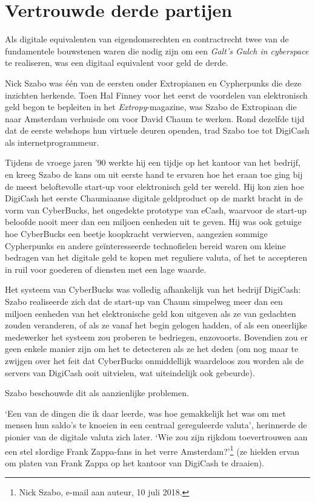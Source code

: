\documentclass[
  a5paper,
  smalldemyvopaper,11pt,twoside,onecolumn,openright,extrafontsizes,
hidelinks]{memoir}
\begin{document}
\section{Vertrouwde derde partijen}\label{vertrouwde-derde-partijen}

Als digitale equivalenten van eigendomsrechten en contractrecht twee van
de fundamentele bouwstenen waren die nodig zijn om een \emph{Galt's
Gulch in cyberspace} te realiseren, was een digitaal equivalent voor
geld de derde.

Nick Szabo was één van de eersten onder Extropianen en Cypherpunks die
deze inzichten herkende. Toen Hal Finney voor het eerst de voordelen van
elektronisch geld begon te bepleiten in het \emph{Extropy}-magazine, was
Szabo de Extropiaan die naar Amsterdam verhuisde om voor David Chaum te
werken. Rond dezelfde tijd dat de eerste webshops hun virtuele deuren
openden, trad Szabo toe tot DigiCash als internetprogrammeur.

Tijdens de vroege jaren '90 werkte hij een tijdje op het kantoor van het
bedrijf, en kreeg Szabo de kans om uit eerste hand te ervaren hoe het
eraan toe ging bij de meest beloftevolle start-up voor elektronisch geld
ter wereld. Hij kon zien hoe DigiCash het eerste Chaumiaanse digitale
geldproduct op de markt bracht in de vorm van CyberBucks, het ongedekte
prototype van eCash, waarvoor de start-up beloofde nooit meer dan een
miljoen eenheden uit te geven. Hij was ook getuige hoe CyberBucks een
beetje koopkracht verwierven, aangezien sommige Cypherpunks en andere
geïnteresseerde technofielen bereid waren om kleine bedragen van het
digitale geld te kopen met reguliere valuta, of het te accepteren in
ruil voor goederen of diensten met een lage waarde.

Het systeem van CyberBucks was volledig afhankelijk van het bedrijf
DigiCash: Szabo realiseerde zich dat de start-up van Chaum simpelweg
meer dan een miljoen eenheden van het elektronische geld kon uitgeven
als ze van gedachten zouden veranderen, of als ze vanaf het begin
gelogen hadden, of als een oneerlijke medewerker het systeem zou
proberen te bedriegen, enzovoorts. Bovendien zou er geen enkele manier
zijn om het te detecteren als ze het deden (om nog maar te zwijgen over
het feit dat CyberBucks onmiddellijk waardeloos zou worden als de
servers van DigiCash ooit uitvielen, wat uiteindelijk ook gebeurde).

Szabo beschouwde dit als aanzienlijke problemen.

`Een van de dingen die ik daar leerde, was hoe gemakkelijk het was om
met mensen hun saldo's te knoeien in een centraal gereguleerde valuta',
herinnerde de pionier van de digitale valuta zich later. `Wie zou zijn
rijkdom toevertrouwen aan een stel slordige Frank Zappa-fans in het
verre Amsterdam?'\footnote{Nick Szabo, e-mail aan auteur, 10 juli 2018.}
(ze hielden ervan om platen van Frank Zappa op het kantoor van DigiCash
te draaien).
\end{document}
